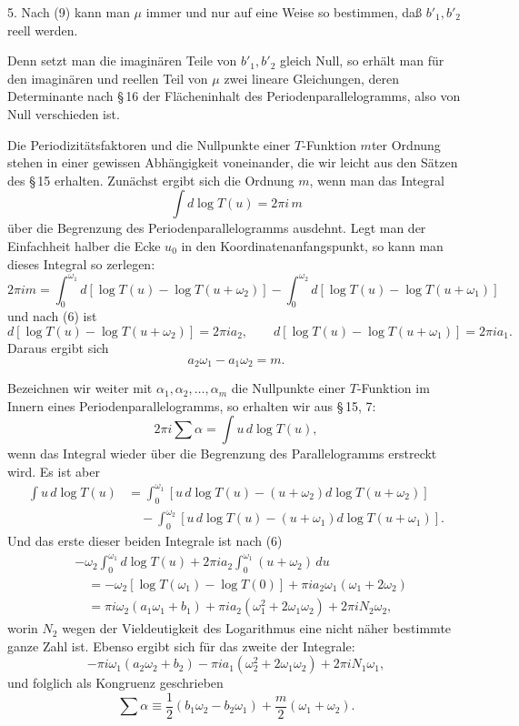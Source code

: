 \documentclass[11pt]{article}
\begin{document}
5. Nach (9) kann man $\mu$ immer und nur auf eine Weise so bestimmen, daß $b'_1,b'_2$ reell werden.

Denn setzt man die imaginären Teile von $b'_1,b'_2$ gleich Null, so erhält man für den imaginären und reellen Teil von $\mu$ zwei lineare Gleichungen, deren Determinante nach \S\,16 der Flächeninhalt des Periodenparallelogramms, also von Null verschieden ist.

Die Periodizitätsfaktoren und die Nullpunkte einer $T$-Funktion $m$ter Ordnung stehen in einer gewissen Abhängigkeit voneinander, die wir leicht aus den Sätzen des \S\,15 erhalten. Zunächst ergibt sich die Ordnung $m$, wenn man das Integral
\[
\int d\log T(u)=2\pi i\,m
\]
über die Begrenzung des Periodenparallelogramms ausdehnt. Legt man der Einfachheit halber die Ecke $u_0$ in den Koordinatenanfangspunkt, so kann man dieses Integral so zerlegen:
\[
2\pi i m=\int_{0}^{\omega_1}d[\log T(u)-\log T(u+\omega_2)]
-\int_{0}^{\omega_2}d[\log T(u)-\log T(u+\omega_1)]
\]
und nach (6) ist
\[
d[\log T(u)-\log T(u+\omega_2)]=2\pi i a_2,\qquad
d[\log T(u)-\log T(u+\omega_1)]=2\pi i a_1.
\]
Daraus ergibt sich
\begin{equation}
a_2\omega_1-a_1\omega_2=m.
\tag{10}
\end{equation}

Bezeichnen wir weiter mit $\alpha_1,\alpha_2,\ldots,\alpha_m$ die Nullpunkte einer $T$-Funktion im Innern eines Periodenparallelogramms, so erhalten wir aus \S\,15, 7:
\[
2\pi i\sum\alpha=\int u\,d\log T(u),
\]
wenn das Integral wieder über die Begrenzung des Parallelogramms erstreckt wird. Es ist aber
\begin{align*}
\int u\,d\log T(u)
&=\int_{0}^{\omega_1}\!\!\left[u\,d\log T(u)-(u+\omega_2)d\log T(u+\omega_2)\right]\\
&\quad-\int_{0}^{\omega_2}\!\!\left[u\,d\log T(u)-(u+\omega_1)d\log T(u+\omega_1)\right].
\end{align*}
Und das erste dieser beiden Integrale ist nach (6)
\begin{align*}
&-\omega_2\int_0^{\omega_1}d\log T(u)+2\pi i a_2\int_0^{\omega_1}(u+\omega_2)\,du\\
&\quad=-\omega_2[\log T(\omega_1)-\log T(0)]+\pi i a_2\omega_1(\omega_1+2\omega_2)\\
&\quad=\pi i\omega_2(a_1\omega_1+b_1)+\pi i a_2(\omega_1^2+2\omega_1\omega_2)+2\pi iN_2\omega_2,
\end{align*}
worin $N_2$ wegen der Vieldeutigkeit des Logarithmus eine nicht näher bestimmte ganze Zahl ist. Ebenso ergibt sich für das zweite der Integrale:
\[
-\pi i\omega_1(a_2\omega_2+b_2)-\pi i a_1(\omega_2^2+2\omega_1\omega_2)+2\pi iN_1\omega_1,
\]
und folglich als Kongruenz geschrieben
\begin{equation}
\sum\alpha\equiv \frac12(b_1\omega_2-b_2\omega_1)+\frac{m}{2}(\omega_1+\omega_2).
\tag{11}
\end{equation}
\end{document}
